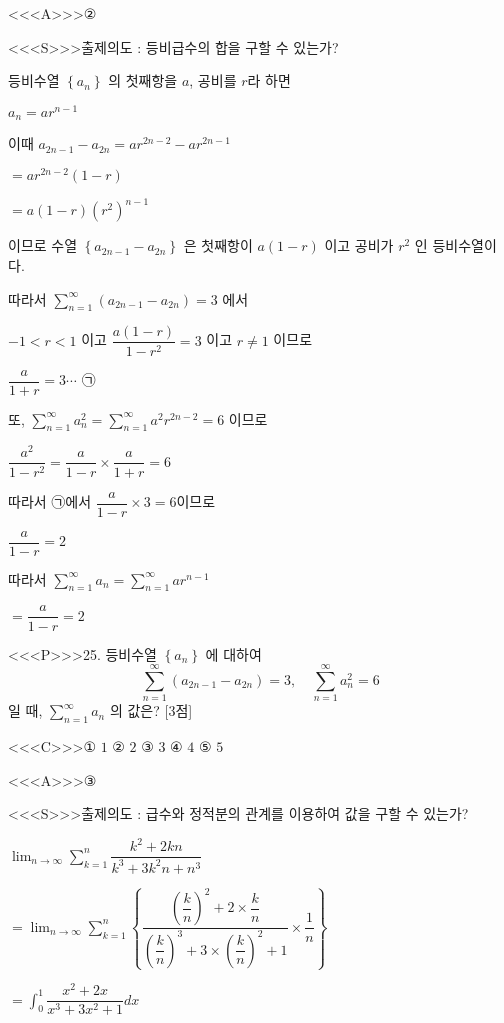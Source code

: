 \documentclass{oblivoir}
\begin{document}
<<<A>>>②

<<<S>>>출제의도 : 등비급수의 합을 구할 수 있는가?

등비수열 $\left\{a_{n}\right\}$ 의 첫째항을 $a$, 공비를 $r$라 하면

$a_{n}=a r^{n-1}$

이때
$a_{2 n-1}-a_{2 n}=a r^{2 n-2}-a r^{2 n-1}$

$=a r^{2 n-2}(1-r)$

$=a(1-r)\left(r^{2}\right)^{n-1}$

이므로 수열 $\left\{a_{2 n-1}-a_{2 n}\right\}$ 은 첫째항이
$a(1-r)$ 이고 공비가 $r^{2}$ 인 등비수열이다.

따라서 $\displaystyle\sum_{n=1}^{\infty}\left(a_{2 n-1}-a_{2 n}\right)=3$ 에서

$-1< r< 1$ 이고 $\dfrac{a(1-r)}{1-r^{2}}=3$ 이고 $r \neq 1$ 이므로

$\dfrac{a}{1+r}=3 \cdots$ ㉠

또, $\displaystyle\sum_{n=1}^{\infty} a_{n}^{2}=\displaystyle\sum_{n=1}^{\infty} a^{2} r^{2 n-2}=6$ 이므로

$\dfrac{a^{2}}{1-r^{2}}=\dfrac{a}{1-r} \times \dfrac{a}{1+r}=6$

따라서 ㉠에서 $\dfrac{a}{1-r} \times 3=6$이므로

$\dfrac{a}{1-r}=2$

따라서
$\displaystyle\sum_{n=1}^{\infty} a_{n}=\displaystyle\sum_{n=1}^{\infty} a r^{n-1}$

$=\dfrac{a}{1-r}=2$


<<<P>>>25. 등비수열 $\left\{a_{n}\right\}$ 에 대하여
$$
\displaystyle\sum_{n=1}^{\infty}\left(a_{2 n-1}-a_{2 n}\right)=3, \quad \displaystyle\sum_{n=1}^{\infty} a_{n}^{2}=6
$$
일 때, $\displaystyle\sum_{n=1}^{\infty} a_{n}$ 의 값은? [3점]

<<<C>>>① $1$
② $2$
③ $3$
④ $4$
⑤ $5$


<<<A>>>③

<<<S>>>출제의도 : 급수와 정적분의 관계를 이용하여 값을 구할 수 있는가?

$\displaystyle\lim _{n \rightarrow \infty} \displaystyle\sum_{k=1}^{n} \dfrac{k^{2}+2 k n}{k^{3}+3 k^{2} n+n^{3}}$

$=\displaystyle\lim _{n \rightarrow \infty} \displaystyle\sum_{k=1}^{n}\left\{\dfrac{\left(\dfrac{k}{n}\right)^{2}+2 \times \dfrac{k}{n}}{\left(\dfrac{k}{n}\right)^{3}+3 \times\left(\dfrac{k}{n}\right)^{2}+1} \times \dfrac{1}{n}\right\}$

$=\displaystyle\int_{0}^{1} \dfrac{x^{2}+2 x}{x^{3}+3 x^{2}+1} d x$
\end{document}
